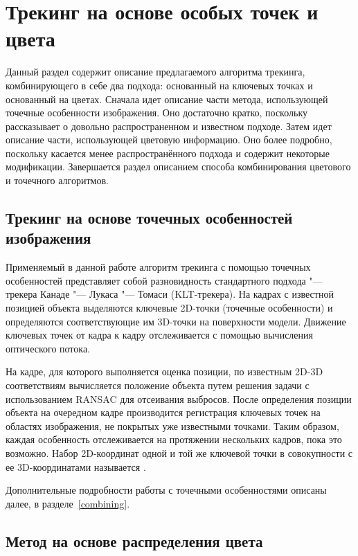 \section{Трекинг на основе особых точек и цвета}\label{tracking}

Данный раздел содержит описание предлагаемого алгоритма трекинга,
комбинирующего в себе два подхода: основанный на ключевых точках
и основанный на цветах.
Сначала идет описание части метода, использующей точечные особенности
изображения.
Оно достаточно кратко, поскольку рассказывает о довольно
распространенном и известном подходе.
Затем идет описание части, использующей цветовую информацию.
Оно более подробно, поскольку касается менее распространённого подхода и
содержит некоторые модификации.
Завершается раздел описанием способа комбинирования цветового и точечного
алгоритмов.

\subsection{Трекинг на основе точечных особенностей изображения}
\label{subs:feat_tracking}

Применяемый в данной работе алгоритм трекинга с помощью точечных особенностей
представляет собой разновидность стандартного подхода "--- трекера
Канаде "--- Лукаса "--- Томаси
(KLT-трекера)\cite{LucasAndKanade,TomasiAndKanade,ShiAndTomasi,PyrLK}.
На кадрах с известной позицией объекта выделяются ключевые 2D-точки (точечные
особенности) и определяются соответствующие им 3D-точки на поверхности модели.
Движение ключевых точек от кадра к кадру отслеживается с помощью вычисления
оптического потока.

На кадре, для которого выполняется оценка позиции, по известным 2D-3D
соответствиям вычисляется положение объекта путем решения задачи
\PnP\cite{LepetitSurvey} с использованием RANSAC\cite{RANSAC} для отсеивания
выбросов.
После определения позиции объекта на очередном кадре производится
регистрация ключевых точек на областях изображения, не покрытых
уже известными точками.
Таким образом, каждая особенность отслеживается на протяжении
нескольких кадров, пока это возможно.
Набор 2D-координат одной и той же ключевой точки в совокупности с ее
3D-координатами называется .

Дополнительные подробности работы с точечными особенностями описаны далее,
в разделе~\ref{combining}.

\subsection{Метод на основе распределения цвета}

